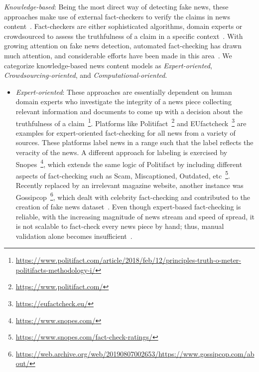 \begin{description}
    \item{\emph{Knowledge-based}}: Being the most direct way of detecting fake news, these approaches make use of external fact-checkers to verify the claims in news content~\parencite{FakeNewsDetectionOnSocialMediaADataMiningPerspective_Shu}. Fact-checkers are either sophisticated algorithms, domain experts or crowdsourced to assess the truthfulness of a claim in a specific context~\parencite{FactChecking_Vlachos}. With growing attention on fake news detection, automated fact-checking has drawn much attention, and considerable efforts have been made in this area~\parencite{AutomatedFactChecking_Thorne, OverviewOfCheckThat_Barroncede}. We categorize knowledge-based news content models as \emph{Expert-oriented}, \emph{Crowdsourcing-oriented}, and \emph{Computational-oriented}.
    \begin{itemize}
        \item \emph{Expert-oriented}: These approaches are essentially dependent on human domain experts who investigate the integrity of a news piece collecting relevant information and documents to come up with a decision about the truthfulness of a claim~\footnote{\url{https://www.politifact.com/article/2018/feb/12/principles-truth-o-meter-politifacts-methodology-i/}}. Platforms like Politifact~\footnote{\url{https://www.politifact.com/}} and EUfactcheck~\footnote{\url{https://eufactcheck.eu/}} are examples for expert-oriented fact-checking for all news from a variety of sources. These platforms label news in a range such that the label reflects the veracity of the news. A different approach for labeling is exercised by Snopes~\footnote{\url{https://www.snopes.com/}}, which extends the same logic of Politifact by including different aspects of fact-checking such as Scam, Miscaptioned, Outdated, etc~\footnote{\url{https://www.snopes.com/fact-check-ratings/}}. Recently replaced by an irrelevant magazine website, another instance was Gossipcop~\footnote{\url{https://web.archive.org/web/20190807002653/https://www.gossipcop.com/about/}}, which dealt with celebrity fact-checking and contributed to the creation of fake news dataset~\parencite{FakeNewsNet_Shu}. Even though expert-based fact-checking is reliable, with the increasing magnitude of news stream and speed of spread, it is not scalable to fact-check every news piece by hand; thus, manual validation alone becomes insufficient~\parencite{ASurveyOnAutomatedFactChecking_Guo}.

\end{itemize}
\end{description}
